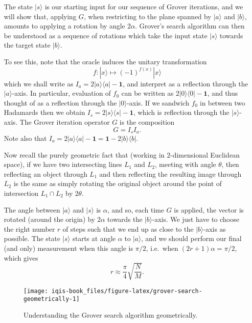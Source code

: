\documentclass[fleqn]{article}
\begin{document}
The state \(|s\rangle\) is our starting input for our sequence of Grover iterations, and we will show that, applying \(G\), when restricting to the plane spanned by \(|a\rangle\) and \(|b\rangle\), amounts to applying a rotation by angle \(2\alpha\).
Grover's search algorithm can then be understood as a sequence of rotations which take the input state \(|s\rangle\) towards the target state \(|b\rangle\).

To see this, note that the oracle induces the unitary transformation
\[
  f\colon |x\rangle \mapsto (-1)^{f(x)}|x\rangle
\]
which we shall write as \(I_a = 2|a\rangle\langle a|-\mathbf{1}\), and interpret as a reflection through the \(|a\rangle\)-axis.
In particular, evaluation of \(f_0\) can be written as \(2|0\rangle\langle 0|-\mathbf{1}\), and thus thought of as a reflection through the \(|0\rangle\)-axis.
If we sandwich \(f_0\) in between two Hadamards then we obtain \(I_s = 2|s\rangle\langle s|-\mathbf{1}\), which is reflection through the \(|s\rangle\)-axis.
The Grover iteration operator \(G\) is the composition
\[
  G = I_s I_a.
\]
Note also that \(I_a = 2|a\rangle\langle a|-\mathbf{1}= \mathbf{1}-2|b\rangle\langle b|\).

Now recall the purely geometric fact that (working in \(2\)-dimensional Euclidean space), if we have two intersecting lines \(L_1\) and \(L_2\), meeting with angle \(\theta\), then reflecting an object through \(L_1\) and then reflecting the resulting image through \(L_2\) is the same as simply rotating the original object around the point of intersection \(L_1\cap L_2\) by \(2\theta\).

The angle between \(|a\rangle\) and \(|s\rangle\) is \(\alpha\), and so, each time \(G\) is applied, the vector is rotated (around the origin) by \(2\alpha\) towards the \(|b\rangle\)-axis.
We just have to choose the right number \(r\) of steps such that we end up as close to the \(|b\rangle\)-axis as possible.
The state \(|s\rangle\) starts at angle \(\alpha\) to \(|a\rangle\), and we should perform our final (and only) measurement when this angle is \(\pi/2\), i.e.~when \((2r+1)\alpha = \pi/2\), which gives
\[
  r \approx \frac{\pi}{4}\sqrt{\frac{N}{M}}.
\]

\begin{figure}[H]

{\centering \texttt{[image: iqis-book\_files/figure-latex/grover-search-geometrically-1]} 

}

\caption{Understanding the Grover search algorithm geometrically.}\label{fig:grover-search-geometrically}
\end{figure}
\end{document}
